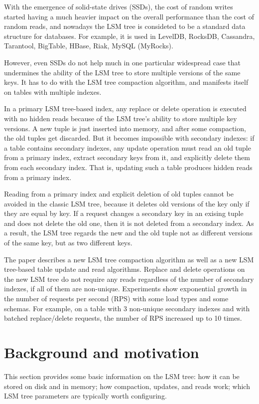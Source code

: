 \documentclass{vldb}
\begin{document}
With the emergence of solid-state drives (SSDs), the cost of random writes started
having a much heavier impact on the overall performance than the cost of random reads,
and nowadays the LSM tree is consideted to be a standard data structure for
databases. For example, it is used in LevelDB, RocksDB, Cassandra, Tarantool,
BigTable, HBase, Riak, MySQL (MyRocks).

However, even SSDs do not help much in one particular widespread case that undermines
the ability of the LSM tree to store multiple versions of the same keys. It has to do
with the LSM tree compaction algorithm, and manifests itself on tables with multiple indexes.

In a primary LSM tree-based index, any replace or delete operation is executed
with no hidden reads because of the LSM tree's ability to store multiple key versions.
A new tuple is just inserted into memory, and after some compaction, the old
tuples get discarded. But it becomes impossible with secondary indexes: if a table
contains secondary indexes, any update operation must read an old tuple from a
primary index, extract secondary keys from it, and explicitly delete them from each
secondary index. That is, updating such a table produces hidden reads from a
primary index.

Reading from a primary index and explicit deletion of old tuples cannot be avoided in the
classic LSM tree, because it deletes old versions of the key only if they are
equal by key. If a request changes a secondary key in an exising tuple and
does not delete the old one, then it is not deleted from a secondary index.
As a result, the LSM tree regards the new and the old tuple not as different
versions of the same key, but as two different keys.

The paper describes a new LSM tree compaction algorithm as well as a new LSM
tree-based table update and read algorithms. Replace and delete operations on the new
LSM tree do not require any reads regardless of the number of secondary indexes, if all of them
are non-unique. Experiments show exponential growth in the number of requests per
second (RPS) with some load types and some schemas. For example, on a table with 3
non-unique secondary indexes and with batched replace/delete requests, the number of RPS
increased up to 10 times.

\section{Background and motivation}
This section provides some basic information on the LSM tree: how it can be
stored on disk and in memory; how compaction, updates, and reads work;
which LSM tree parameters are typically worth configuring.
\end{document}
